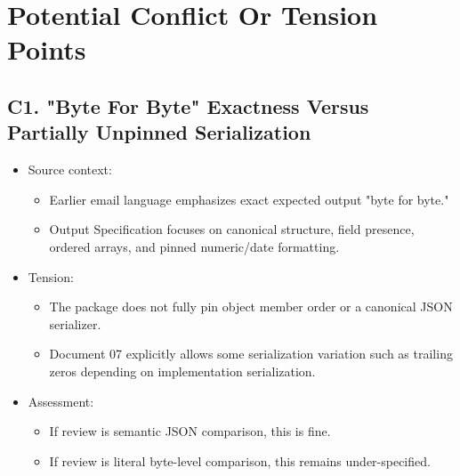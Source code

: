 \documentclass[11pt]{article}
\begin{document}
\section{Potential Conflict Or Tension Points}
\label{sec:orgaa11bb8}
\subsection{C1. "Byte For Byte" Exactness Versus Partially Unpinned Serialization}
\label{sec:org21510a3}
\begin{itemize}
\item Source context:
\begin{itemize}
\item Earlier email language emphasizes exact expected output "byte for byte."
\item Output Specification focuses on canonical structure, field presence, ordered arrays, and pinned numeric/date formatting.
\end{itemize}
\item Tension:
\begin{itemize}
\item The package does not fully pin object member order or a canonical JSON serializer.
\item Document 07 explicitly allows some serialization variation such as trailing zeros depending on implementation serialization.
\end{itemize}
\item Assessment:
\begin{itemize}
\item If review is semantic JSON comparison, this is fine.
\item If review is literal byte-level comparison, this remains under-specified.
\end{itemize}
\end{itemize}
\end{document}
